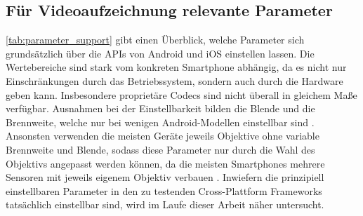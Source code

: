 \subsection{Für Videoaufzeichnung relevante Parameter}
\label{sec:relevante_parameter}

\autoref{tab:parameter_support} gibt einen Überblick, welche Parameter sich grundsätzlich über die \acp{API} von Android und iOS einstellen lassen.
Die Wertebereiche sind stark vom konkreten Smartphone abhängig, da es nicht nur Einschränkungen durch das Betriebssystem, sondern auch durch die Hardware geben kann.
Insbesondere proprietäre Codecs sind nicht überall in gleichem Maße verfügbar.
Ausnahmen bei der Einstellbarkeit bilden die Blende und die Brennweite, welche nur bei wenigen Android-Modellen einstellbar sind \cite{Sony_VariableZoom,VariableAperture_Smartphones}.
Ansonsten verwenden die meisten Geräte jeweils Objektive ohne variable Brennweite und Blende, sodass diese Parameter nur durch die Wahl des Objektivs angepasst werden können, da die meisten Smartphones mehrere Sensoren mit jeweils eigenem Objektiv verbauen \cite[S. 499ff.]{Schmidt_Videotechnik}.
Inwiefern die prinzipiell einstellbaren Parameter in den zu testenden Cross-Plattform Frameworks tatsächlich einstellbar sind, wird im Laufe dieser Arbeit näher untersucht.

